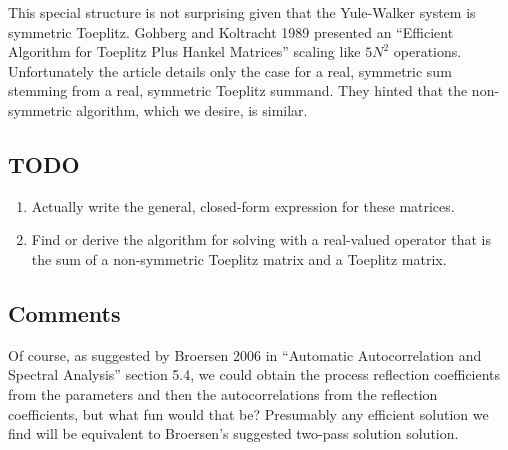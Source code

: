 \documentclass[12pt,letterpaper]{article}
\begin{document}
This special structure is not surprising given that the Yule-Walker system is
symmetric Toeplitz. Gohberg and Koltracht 1989 presented an ``Efficient
Algorithm for Toeplitz Plus Hankel Matrices'' scaling like $5N^2$ operations.
Unfortunately the article details only the case for a real, symmetric sum
stemming from a real, symmetric Toeplitz summand. They hinted that the
non-symmetric algorithm, which we desire, is similar.

\subsection*{TODO}

\begin{enumerate}
 \item Actually write the general, closed-form expression for these matrices.
 \item Find or derive the algorithm for solving with a real-valued operator
  that is the sum of a non-symmetric Toeplitz matrix and a Toeplitz matrix.
\end{enumerate}

\subsection*{Comments}

Of course, as suggested by Broersen 2006 in ``Automatic Autocorrelation and
Spectral Analysis'' section 5.4, we could obtain the process reflection
coefficients from the parameters and then the autocorrelations from the
reflection coefficients, but what fun would that be?  Presumably any efficient
solution we find will be equivalent to Broersen's suggested two-pass solution
solution.
\end{document}
